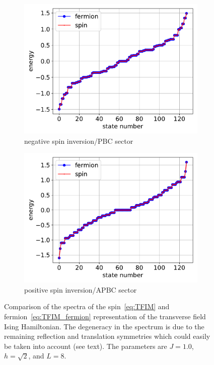 \documentclass{SciPost}
\newcommand\0{\scalebox{-1}[1]{0}}
\begin{document}
\begin{figure}[t!]
	\centering
	\begin{subfigure}[b]{0.496\textwidth}
		\includegraphics[width=\textwidth]{JW_PBC.pdf}
		\caption{negative spin inversion/PBC sector}
	\end{subfigure}
	\begin{subfigure}[b]{0.496\textwidth}
		\includegraphics[width=\textwidth]{JW_APBC.pdf}
		\caption{positive spin inversion/APBC sector}
	\end{subfigure}
	\caption{\label{fig:JW} Comparison of the spectra of the spin~\eqref{eq:TFIM} and fermion~\eqref{eq:TFIM_fermion} representation of the transverse field Ising Hamiltonian. The degeneracy in the spectrum is due to the remaining reflection and translation symmetries which could easily be taken into account (see text). The parameters are $J=1.0$, $h=\sqrt{2}$, and $L=8$.}  
\end{figure}
 
\end{document}
